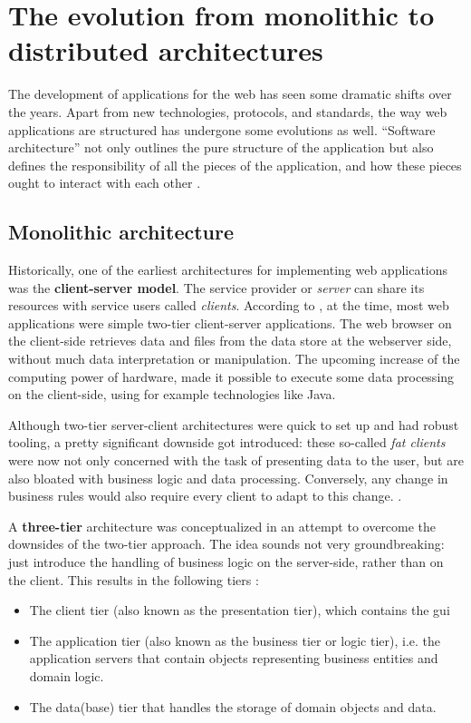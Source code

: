\section{The evolution from monolithic to distributed architectures}

The development of applications for the web has seen some dramatic shifts over
the years. Apart from new technologies, protocols, and standards, the way web
applications are structured has undergone some evolutions as well. ``Software
architecture'' not only outlines the pure structure of the application but also
defines the responsibility of all the pieces of the application, and how these
pieces ought to interact with each other \autocite{Fedorov_etal_1998}.


\subsection{Monolithic architecture}

Historically, one of the earliest architectures for implementing web
applications was the \textbf{client-server model}. The service provider or
\textit{server} can share its resources with service users called
\textit{clients}. According to \textcite{Reese_2000}, at the time, most web
applications were simple two-tier client-server applications. The web browser on
the client-side retrieves data and files from the data store at the webserver
side, without much data interpretation or manipulation. The upcoming increase of
the computing power of hardware, made it possible to execute some data
processing on the client-side, using for example technologies like Java. 

Although two-tier server-client architectures were quick to set up and had
robust tooling, a pretty significant downside got introduced: these so-called
\textit{fat clients} were now not only concerned with the task of presenting
data to the user, but are also bloated with business logic and data processing.
Conversely, any change in business rules would also require every client to adapt
to this change. \autocite{Gallaugher_Ramanathan_1996}.

A \textbf{three-tier} architecture was conceptualized in an attempt to overcome
the downsides of the two-tier approach. The idea sounds not very groundbreaking:
just introduce the handling of business logic on the server-side, rather than on
the client. This results in the following tiers \autocite{Aarsten_etal_1996}:

\begin{itemize}
    \item The client tier (also known as the presentation tier), which contains
    the \gls{gui}
    \item The application tier (also known as the business tier or logic tier),
    i.e. the application servers that contain objects representing business
    entities and domain logic.
    \item The data(base) tier that handles the storage of domain objects and data.
\end{itemize}



